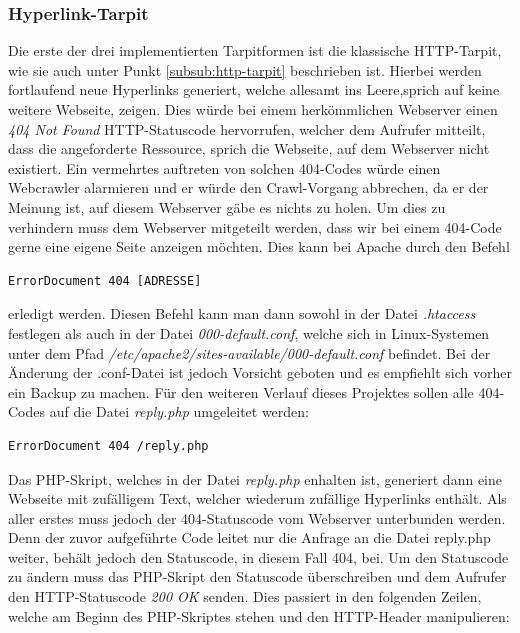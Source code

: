 \subsubsection{Hyperlink-Tarpit}
Die erste der drei implementierten Tarpitformen ist die klassische HTTP-Tarpit, wie sie auch unter Punkt \ref{subsub:http-tarpit} beschrieben ist. Hierbei werden fortlaufend neue Hyperlinks generiert, welche allesamt \glqq ins Leere\grqq,\space sprich auf keine weitere Webseite, zeigen. Dies würde bei einem herkömmlichen Webserver einen \emph{404 Not Found} HTTP-Statuscode hervorrufen, welcher dem Aufrufer mitteilt, dass die angeforderte Ressource, sprich die Webseite, auf dem Webserver nicht existiert. Ein vermehrtes auftreten von solchen 404-Codes würde einen Webcrawler alarmieren und er würde den Crawl-Vorgang abbrechen, da er der Meinung ist, auf diesem Webserver gäbe es nichts zu holen. Um dies zu verhindern muss dem Webserver mitgeteilt werden, dass wir bei einem 404-Code gerne eine eigene Seite anzeigen möchten. Dies kann bei Apache durch den Befehl
\begin{lstlisting}
ErrorDocument 404 [ADRESSE]
\end{lstlisting} 
erledigt werden. Diesen Befehl kann man dann sowohl in der Datei \emph{.htaccess} festlegen als auch in der Datei \emph{000-default.conf}, welche sich in Linux-Systemen unter dem Pfad \emph{/etc/apache2/sites-available/000-default.conf} befindet. Bei der Änderung der .conf-Datei ist jedoch Vorsicht geboten und es empfiehlt sich vorher ein Backup zu machen. Für den weiteren Verlauf dieses Projektes sollen alle 404-Codes auf die Datei \emph{reply.php} umgeleitet werden:
\begin{lstlisting}
ErrorDocument 404 /reply.php
\end{lstlisting}
Das PHP-Skript, welches in der Datei \emph{reply.php} enhalten ist, generiert dann eine Webseite mit zufälligem Text, welcher wiederum zufällige Hyperlinks enthält. Als aller erstes muss jedoch der 404-Statuscode vom Webserver unterbunden werden. Denn der zuvor aufgeführte Code leitet nur die Anfrage an die Datei reply.php weiter, behält jedoch den Statuscode, in diesem Fall 404, bei. Um den Statuscode zu ändern muss das PHP-Skript den Statuscode überschreiben und dem Aufrufer den HTTP-Statuscode \emph{200 OK} senden. Dies passiert in den folgenden Zeilen, welche am Beginn des PHP-Skriptes stehen und den HTTP-Header manipulieren:

\newpage
